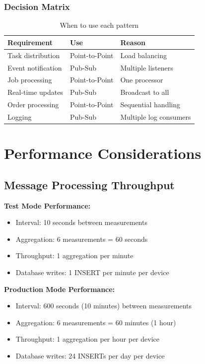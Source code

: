 \documentclass[12pt,a4paper]{article}
\begin{document}
\subsubsection{Decision Matrix}

\begin{table}[h]
\centering
\begin{tabular}{|l|l|l|}
\hline
\textbf{Requirement} & \textbf{Use} & \textbf{Reason} \\
\hline
Task distribution & Point-to-Point & Load balancing \\
Event notification & Pub-Sub & Multiple listeners \\
Job processing & Point-to-Point & One processor \\
Real-time updates & Pub-Sub & Broadcast to all \\
Order processing & Point-to-Point & Sequential handling \\
Logging & Pub-Sub & Multiple log consumers \\
\hline
\end{tabular}
\caption{When to use each pattern}
\end{table}

\newpage

\section{Performance Considerations}

\subsection{Message Processing Throughput}

\textbf{Test Mode Performance:}
\begin{itemize}
    \item Interval: 10 seconds between measurements
    \item Aggregation: 6 measurements = 60 seconds
    \item Throughput: 1 aggregation per minute
    \item Database writes: 1 INSERT per minute per device
\end{itemize}

\textbf{Production Mode Performance:}
\begin{itemize}
    \item Interval: 600 seconds (10 minutes) between measurements
    \item Aggregation: 6 measurements = 60 minutes (1 hour)
    \item Throughput: 1 aggregation per hour per device
    \item Database writes: 24 INSERTs per day per device
\end{itemize}
\end{document}
